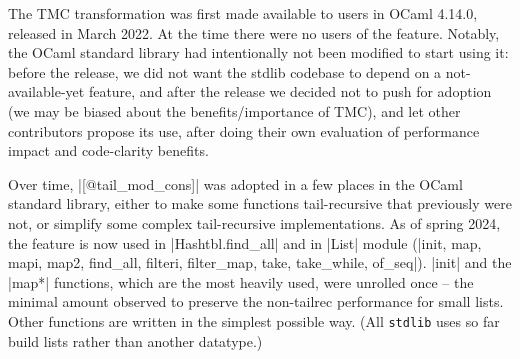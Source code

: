 
The TMC transformation was first made available to users in OCaml 4.14.0, released in March 2022.
At the time there were no users of the feature.
Notably, the OCaml standard library had intentionally not been modified to start using it: before the release, we did not want the stdlib codebase to depend on a not-available-yet feature, and after the release we decided not to push for adoption (we may be biased about the benefits/importance of TMC), and let other contributors propose its use, after doing their own evaluation of performance impact and code-clarity benefits.

Over time, \ocaml|[@tail_mod_cons]| was adopted in a few places in the OCaml standard library, either to make some functions tail-recursive that previously were not, or simplify some complex tail-recursive implementations. As of spring 2024, the feature is now used in \ocaml|Hashtbl.find_all| and in \ocaml|List| module (\ocaml|init, map, mapi, map2, find_all, filteri, filter_map, take, take_while, of_seq|). \ocaml|init| and the \ocaml|map*| functions, which are the most heavily used, were unrolled once -- the minimal amount observed to preserve the non-tailrec performance for small lists. Other functions are written in the simplest possible way. (All \texttt{stdlib} uses so far build lists rather than another datatype.)

